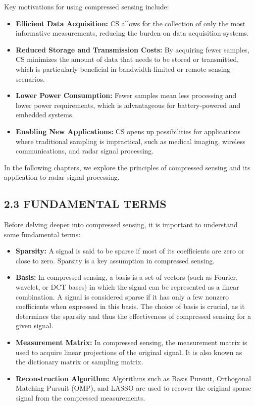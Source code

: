 \documentclass[
  letterpaper,
  DIV=11,
  numbers=noendperiod]{scrartcl}
\providecommand{\tightlist}{%
  \setlength{\itemsep}{0pt}\setlength{\parskip}{0pt}}
\begin{document}
Key motivations for using compressed sensing include:

\begin{itemize}
\tightlist
\item
  \textbf{Efficient Data Acquisition:} CS allows for the collection of
  only the most informative measurements, reducing the burden on data
  acquisition systems.
\item
  \textbf{Reduced Storage and Transmission Costs:} By acquiring fewer
  samples, CS minimizes the amount of data that needs to be stored or
  transmitted, which is particularly beneficial in bandwidth-limited or
  remote sensing scenarios.
\item
  \textbf{Lower Power Consumption:} Fewer samples mean less processing
  and lower power requirements, which is advantageous for
  battery-powered and embedded systems.
\item
  \textbf{Enabling New Applications:} CS opens up possibilities for
  applications where traditional sampling is impractical, such as
  medical imaging, wireless communications, and radar signal processing.
\end{itemize}

In the following chapters, we explore the principles of compressed
sensing and its application to radar signal processing.

\subsection{2.3 FUNDAMENTAL TERMS}\label{fundamental-terms}

Before delving deeper into compressed sensing, it is important to
understand some fundamental terms:

\begin{itemize}
\tightlist
\item
  \textbf{Sparsity:} A signal is said to be sparse if most of its
  coefficients are zero or close to zero. Sparsity is a key assumption
  in compressed sensing.
\item
  \textbf{Basis:} In compressed sensing, a basis is a set of vectors
  (such as Fourier, wavelet, or DCT bases) in which the signal can be
  represented as a linear combination. A signal is considered sparse if
  it has only a few nonzero coefficients when expressed in this basis.
  The choice of basis is crucial, as it determines the sparsity and thus
  the effectiveness of compressed sensing for a given signal.
\item
  \textbf{Measurement Matrix:} In compressed sensing, the measurement
  matrix is used to acquire linear projections of the original signal.
  It is also known as the dictionary matrix or sampling matrix.
\item
  \textbf{Reconstruction Algorithm:} Algorithms such as Basis Pursuit,
  Orthogonal Matching Pursuit (OMP), and LASSO are used to recover the
  original sparse signal from the compressed measurements.
\end{itemize}
\end{document}
